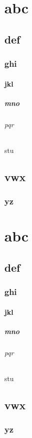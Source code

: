 \documentclass{fithesis3}
\begin{document}
  \tableofcontents

  \part{abc}
  \chapter{def}
  \section{ghi}
  \subsection{jkl}
  \subsubsection{mno}
  \paragraph{pqr}
  \subparagraph{stu}
  \chapter{vwx}
  \section{yz}

  \part{abc}
  \chapter{def}
  \section{ghi}
  \subsection{jkl}
  \subsubsection{mno}
  \paragraph{pqr}
  \subparagraph{stu}
  \chapter{vwx}
  \section{yz}
\end{document}
